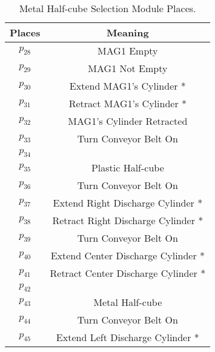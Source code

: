 \begin{table}[htbp]
\caption{Metal Half-cube Selection Module Places.}
\centering
\begin{tabular}{cc}
Places & Meaning\\
\hline
\hyperlink{partialNet:p28}{\hypertarget{partialTable:p28}{$p_{28}$}} & MAG1 Empty\\
\hyperlink{partialNet:p29}{\hypertarget{partialTable:p29}{$p_{29}$}} & MAG1 Not Empty\\
\hyperlink{partialNet:p30}{\hypertarget{partialTable:p30}{$p_{30}$}} & Extend MAG1's Cylinder *\\
\hyperlink{partialNet:p31}{\hypertarget{partialTable:p31}{$p_{31}$}} & Retract MAG1's Cylinder *\\
\hyperlink{partialNet:p32}{\hypertarget{partialTable:p32}{$p_{32}$}} & MAG1's Cylinder Retracted\\
\hyperlink{partialNet:p33}{\hypertarget{partialTable:p33}{$p_{33}$}} & Turn Conveyor Belt On\\
\hyperlink{partialNet:p34}{\hypertarget{partialTable:p34}{$p_{34}$}} & \\
\hyperlink{partialNet:p35}{\hypertarget{partialTable:p35}{$p_{35}$}} & Plastic Half-cube\\
\hyperlink{partialNet:p36}{\hypertarget{partialTable:p36}{$p_{36}$}} & Turn Conveyor Belt On\\
\hyperlink{partialNet:p37}{\hypertarget{partialTable:p37}{$p_{37}$}} & Extend Right Discharge Cylinder *\\
\hyperlink{partialNet:p38}{\hypertarget{partialTable:p38}{$p_{38}$}} & Retract Right Discharge Cylinder *\\
\hyperlink{partialNet:p39}{\hypertarget{partialTable:p39}{$p_{39}$}} & Turn Conveyor Belt On\\
\hyperlink{partialNet:p40}{\hypertarget{partialTable:p40}{$p_{40}$}} & Extend Center Discharge Cylinder *\\
\hyperlink{partialNet:p41}{\hypertarget{partialTable:p41}{$p_{41}$}} & Retract Center Discharge Cylinder *\\
\hyperlink{partialNet:p42}{\hypertarget{partialTable:p42}{$p_{42}$}} & \\
\hyperlink{partialNet:p43}{\hypertarget{partialTable:p43}{$p_{43}$}} & Metal Half-cube\\
\hyperlink{partialNet:p44}{\hypertarget{partialTable:p44}{$p_{44}$}} & Turn Conveyor Belt On\\
\hyperlink{partialNet:p45}{\hypertarget{partialTable:p45}{$p_{45}$}} & Extend Left Discharge Cylinder *\\

\end{tabular}
\end{table}
